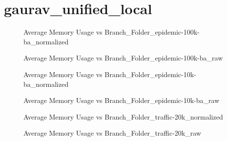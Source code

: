 \section{gaurav\_unified\_local}
\begin{figure}[H]
\centering

\caption{Average Memory Usage vs Branch\_Folder\_epidemic-100k-ba\_normalized}
\end{figure}
\vspace{1cm}
\begin{figure}[H]
\centering

\caption{Average Memory Usage vs Branch\_Folder\_epidemic-100k-ba\_raw}
\end{figure}
\vspace{1cm}
\newpage
\begin{figure}[H]
\centering

\caption{Average Memory Usage vs Branch\_Folder\_epidemic-10k-ba\_normalized}
\end{figure}
\vspace{1cm}
\begin{figure}[H]
\centering

\caption{Average Memory Usage vs Branch\_Folder\_epidemic-10k-ba\_raw}
\end{figure}
\vspace{1cm}
\newpage
\begin{figure}[H]
\centering

\caption{Average Memory Usage vs Branch\_Folder\_traffic-20k\_normalized}
\end{figure}
\vspace{1cm}
\begin{figure}[H]
\centering

\caption{Average Memory Usage vs Branch\_Folder\_traffic-20k\_raw}
\end{figure}
